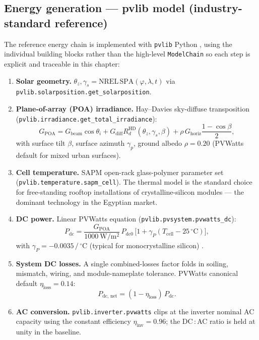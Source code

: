 \subsection{Energy generation --- pvlib model (industry-standard reference)}
\label{sec:pvlib}

The reference energy chain is implemented with \texttt{pvlib} Python
\citep{pvlib}, using the individual building blocks rather than the
high-level \texttt{ModelChain} so each step is explicit and traceable
in this chapter:

\begin{enumerate}[leftmargin=*]
\item \textbf{Solar geometry.}
$\theta_z, \gamma_s = \mathrm{NREL\,SPA}(\varphi, \lambda, t)$
via \texttt{pvlib.solarposition.get\_solarposition}.

\item \textbf{Plane-of-array (POA) irradiance.} Hay--Davies
sky-diffuse transposition (\texttt{pvlib.irradiance.get\_total\_irradiance}):
\begin{equation}
G_{\text{POA}} = G_{\text{beam}} \cos\theta_i
+ G_{\text{diff}} R_d^{\text{HD}}(\theta_z, \gamma_s, \beta)
+ \rho \, G_{\text{horiz}} \frac{1-\cos\beta}{2},
\label{eq:poa}
\end{equation}
with surface tilt $\beta$, surface azimuth $\gamma_p$, ground albedo
$\rho=0.20$ (PVWatts default for mixed urban surfaces).

\item \textbf{Cell temperature.} SAPM open-rack glass-polymer
parameter set (\texttt{pvlib.temperature.sapm\_cell}). The thermal
model is the standard choice for free-standing rooftop installations
of crystalline-silicon modules --- the dominant technology in the
Egyptian market.

\item \textbf{DC power.} Linear PVWatts equation
(\texttt{pvlib.pvsystem.pvwatts\_dc}):
\begin{equation}
P_{\text{dc}} = \frac{G_{\text{POA}}}{1000~\mathrm{W/m^{2}}}
\, P_{\text{dc0}}
\, \bigl[1 + \gamma_{P}(T_{\text{cell}} - 25\,^{\circ}\mathrm{C})\bigr],
\label{eq:pvwatts}
\end{equation}
with $\gamma_{P} = -0.0035\,/\,^{\circ}\mathrm{C}$ (typical for
monocrystalline silicon) \citep{pvwatts2014}.

\item \textbf{System DC losses.} A single combined-losses factor
folds in soiling, mismatch, wiring, and module-nameplate tolerance.
PVWatts canonical default $\eta_{\text{loss}} = 0.14$:
\begin{equation}
P_{\text{dc, net}} = (1 - \eta_{\text{loss}}) \, P_{\text{dc}}.
\label{eq:dcloss}
\end{equation}

\item \textbf{AC conversion.} \texttt{pvlib.inverter.pvwatts} clips
at the inverter nominal AC capacity using the constant efficiency
$\eta_{\text{inv}}=0.96$; the DC\,:\,AC ratio is held at unity in the
baseline.
\end{enumerate}

